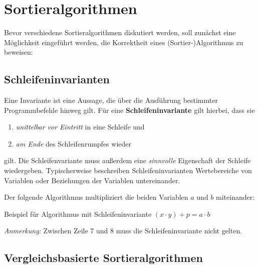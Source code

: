 \section{Sortieralgorithmen}
Bevor verschiedene Sortieralgorithmen diskutiert werden, soll zunächst eine Möglichkeit eingeführt werden, die Korrektheit eines (Sortier-)Algorithmus zu beweisen:

\subsection{Schleifeninvarianten}
Eine Invariante ist eine Aussage, die über die Ausführung bestimmter Programmbefehle hinweg gilt. Für eine \textbf{Schleifeninvariante} gilt hierbei, dass sie
\begin{enumerate}
	\item \emph{unittelbar vor Eintritt} in eine Schleife und
	\item \emph{am Ende} des Schleifenrumpfes wieder
\end{enumerate}
gilt. Die Schleifenvariante muss außerdem eine \emph{sinnvolle} Eigenschaft der Schleife wiedergeben. Typischerweise beschreiben Schleifeninvarianten Wertebereiche von Variablen oder Beziehungen der Variablen untereinander.

\begin{bsp}
	Der folgende Algorithmus multipliziert die beiden Variablen $a$ und $b$ miteinander:
	\begin{algorithm}[H]
		\caption{Beispiel für Algorithmus mit Schleifeninvariante $(x \cdot y) + p = a \cdot b$}
		\begin{algorithmic}[1]
			 
			\State{} 
			\State{} 
			\EndWhile
			\State{} 
			\State {}
			\EndProcedure
		\end{algorithmic}
	\end{algorithm}
	\emph{Anmerkung:} Zwischen Zeile 7 und 8 muss die Schleifeninvariante nicht gelten.
\end{bsp}

\subsection{Vergleichsbasierte Sortieralgorithmen}

